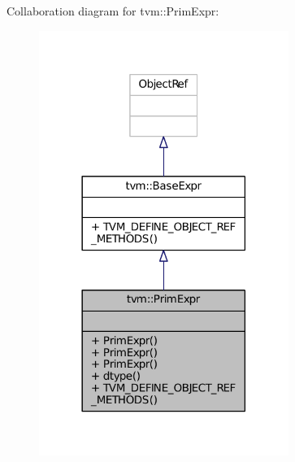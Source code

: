 Collaboration diagram for tvm\+:\+:Prim\+Expr\+:
\nopagebreak
\begin{figure}[H]
\begin{center}
\leavevmode
\includegraphics[width=230pt]{classtvm_1_1PrimExpr__coll__graph}
\end{center}
\end{figure}

